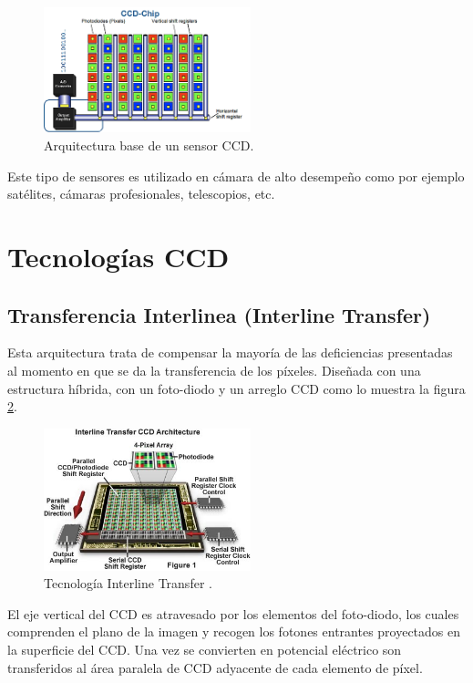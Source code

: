 \documentclass[conference]{IEEEtran}
\begin{document}
\begin{figure}[H]
\centering
\includegraphics[width=6cm]{ccd}
\caption{Arquitectura base de un sensor CCD.}
\label{sensor_ccd}
\end{figure}

Este tipo de sensores es utilizado en cámara de alto desempe\~no como por ejemplo satélites, cámaras profesionales, telescopios, etc.

\section{\textbf{Tecnologías CCD}}
 
\subsection{\textbf{Transferencia Interlinea (Interline Transfer)}}

Esta arquitectura trata de compensar la mayoría de las deficiencias presentadas al momento en que se da la transferencia de los píxeles. Dise\~nada con una estructura híbrida, con un foto-diodo y un arreglo CCD como lo muestra la figura \ref{il_ccd}. 

\begin{figure}[H]
\centering
\includegraphics[width=6cm]{interlineccd}
\caption{Tecnología Interline Transfer \cite{IL_CCD1}.}
\label{il_ccd}
\end{figure}

El eje vertical del CCD es atravesado por los elementos del foto-diodo, los cuales comprenden el plano de la imagen y recogen los fotones entrantes proyectados en la superficie del CCD. Una vez se convierten en potencial eléctrico son transferidos al área paralela de CCD adyacente de cada elemento de píxel.
\end{document}
